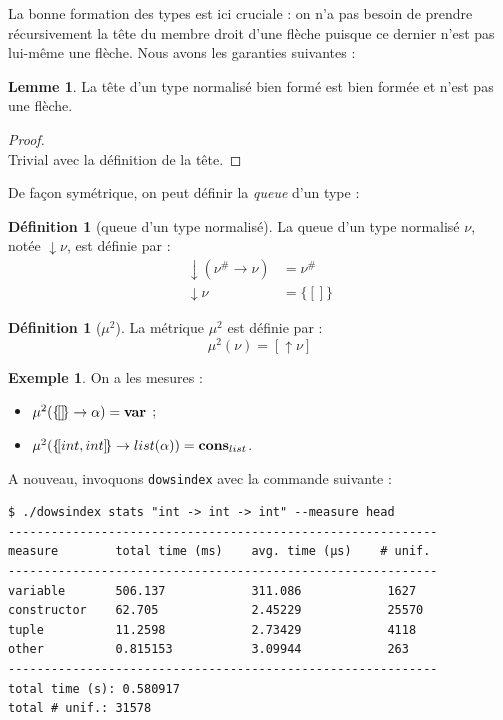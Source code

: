 \documentclass[a4paper]{report}
\newenvironment{preuve} 
  {\begin{proof}~\\} 
  {\end{proof}}
\theoremstyle{definition}
\newtheorem{definition}[theoreme]{Définition}
\newtheorem{lemme}[theoreme]{Lemme}
\newtheorem{exemple}[theoreme]{Exemple}
\newcommand{\dowsindex}{\texttt{dowsindex}\xspace}
\newcommand{\mset}[1]{\{\![#1]\!\}}
\begin{document}
La bonne formation des types est ici cruciale : on n'a pas besoin de prendre récursivement la tête du membre droit d'une flèche puisque ce dernier n'est pas lui-même une flèche. Nous avons les garanties suivantes :

\begin{lemme} \label{bf_implique_tete_bf_et_non_fleche}
  La tête d'un type normalisé bien formé est bien formée et n'est pas une flèche.
\end{lemme}

\begin{preuve}
  Trivial avec la définition de la tête.
\end{preuve}

De façon symétrique, on peut définir la \emph{queue} d'un type :

\begin{definition}[queue d'un type normalisé]
  La queue d'un type normalisé $\nu$, notée $\downarrow \nu$, est définie par :
  \begin{align*}
      \downarrow (\nu^\# \rightarrow \nu) &=
      \nu^\#
    \\
      \downarrow \nu &=
      \mset{}
  \end{align*}
\end{definition}

\begin{definition}[$\mu^2$]
	La métrique $\mu^2$ est définie par :
	\[ \mu^2 (\nu) = [ \uparrow \nu ] \]
\end{definition}

\begin{exemple}
	On a les mesures :
	\begin{itemize}
		\item $\mu^2 (\mset{} \rightarrow \alpha) = \bold{var}$ ;
		\item $\mu^2 (\mset{int, int} \rightarrow list (\alpha)) = \bold{cons}_{list}$.
	\end{itemize}
\end{exemple}

A nouveau, invoquons \dowsindex avec la commande suivante :

\begin{verbatim}
$ ./dowsindex stats "int -> int -> int" --measure head
------------------------------------------------------------
measure        total time (ms)    avg. time (µs)    # unif.
------------------------------------------------------------
variable       506.137            311.086            1627
constructor    62.705             2.45229            25570
tuple          11.2598            2.73429            4118
other          0.815153           3.09944            263
------------------------------------------------------------
total time (s): 0.580917
total # unif.: 31578
\end{verbatim}
\end{document}
